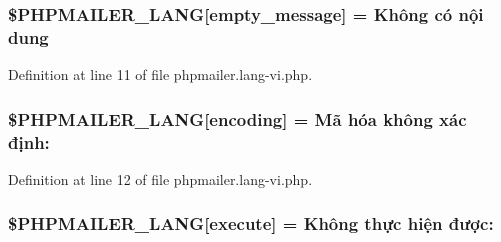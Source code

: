 \subsubsection[{\texorpdfstring{\$\+P\+H\+P\+M\+A\+I\+L\+E\+R\+\_\+\+L\+A\+NG}{$PHPMAILER_LANG}}]{\setlength{\rightskip}{0pt plus 5cm}\$P\+H\+P\+M\+A\+I\+L\+E\+R\+\_\+\+L\+A\+NG\mbox{[}\textquotesingle{}empty\+\_\+message\textquotesingle{}\mbox{]} = \textquotesingle{}Không có nội dung\textquotesingle{}}\hypertarget{phpmailer_8lang-vi_8php_a33772099f637c9d6c2cd7425e0e37fed}{}\label{phpmailer_8lang-vi_8php_a33772099f637c9d6c2cd7425e0e37fed}


Definition at line 11 of file phpmailer.\+lang-\/vi.\+php.

\subsubsection[{\texorpdfstring{\$\+P\+H\+P\+M\+A\+I\+L\+E\+R\+\_\+\+L\+A\+NG}{$PHPMAILER_LANG}}]{\setlength{\rightskip}{0pt plus 5cm}\$P\+H\+P\+M\+A\+I\+L\+E\+R\+\_\+\+L\+A\+NG\mbox{[}\textquotesingle{}encoding\textquotesingle{}\mbox{]} = \textquotesingle{}Mã hóa không xác định\+: \textquotesingle{}}\hypertarget{phpmailer_8lang-vi_8php_a817f7283f3d54c970a0c10305cc668cc}{}\label{phpmailer_8lang-vi_8php_a817f7283f3d54c970a0c10305cc668cc}


Definition at line 12 of file phpmailer.\+lang-\/vi.\+php.

\subsubsection[{\texorpdfstring{\$\+P\+H\+P\+M\+A\+I\+L\+E\+R\+\_\+\+L\+A\+NG}{$PHPMAILER_LANG}}]{\setlength{\rightskip}{0pt plus 5cm}\$P\+H\+P\+M\+A\+I\+L\+E\+R\+\_\+\+L\+A\+NG\mbox{[}\textquotesingle{}execute\textquotesingle{}\mbox{]} = \textquotesingle{}Không thực hiện được\+: \textquotesingle{}}\hypertarget{phpmailer_8lang-vi_8php_a668217a9563a168f30f2a8548b6ed5a9}{}\label{phpmailer_8lang-vi_8php_a668217a9563a168f30f2a8548b6ed5a9}


